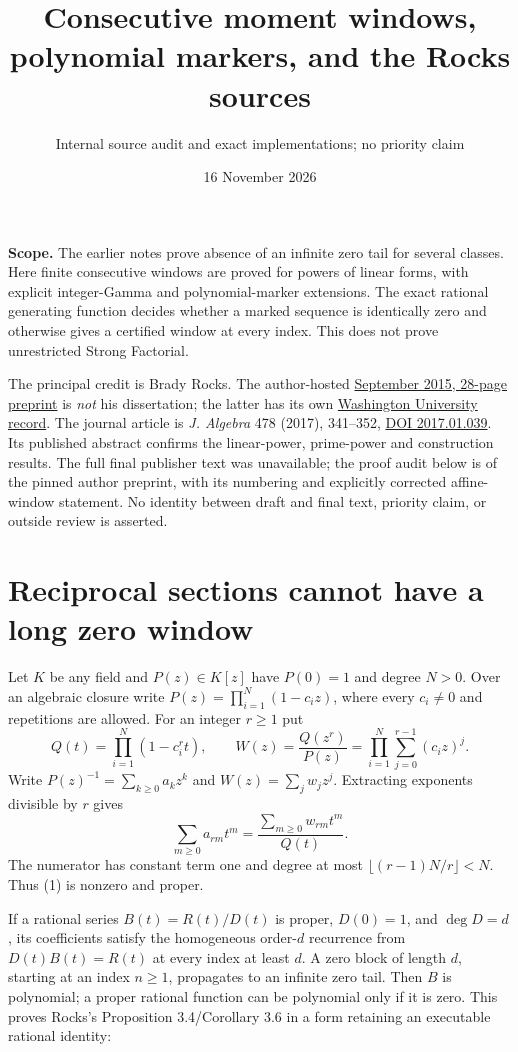 \documentclass[11pt]{article}
\title{Consecutive moment windows, polynomial markers, and the Rocks sources}
\author{Internal source audit and exact implementations; no priority claim}
\date{16 November 2026}
\begin{document}
\maketitle
\noindent\textbf{Scope.}
The earlier notes prove absence of an infinite zero tail for several
classes. Here finite consecutive windows are proved for powers of linear
forms, with explicit integer-Gamma and polynomial-marker extensions.
The exact rational generating function decides whether a marked sequence
is identically zero and otherwise gives a certified window at every index.
This does not prove unrestricted Strong Factorial.

The principal credit is Brady Rocks. The author-hosted
\href{sources/rocks-2015-author-preprint.pdf}{September 2015, 28-page preprint}
is \emph{not} his dissertation; the latter has its own
\href{https://doi.org/10.7936/K7BR8QB4}{Washington University record}.
The journal article is \emph{J. Algebra} 478 (2017), 341--352,
\href{https://doi.org/10.1016/j.jalgebra.2017.01.039}{DOI 2017.01.039}.
Its published abstract confirms the linear-power, prime-power and
construction results. The full final publisher text was unavailable;
the proof audit below is of the pinned author preprint, with its numbering
and explicitly corrected affine-window statement. No identity between
draft and final text, priority claim, or outside review is asserted.

\section{Reciprocal sections cannot have a long zero window}
Let $K$ be any field and $P(z)\in K[z]$ have $P(0)=1$ and degree $N>0$.
Over an algebraic closure write $P(z)=\prod_{i=1}^N(1-c_i z)$,
where every $c_i\ne0$ and repetitions are allowed. For an integer $r\ge1$ put
\[
 Q(t)=\prod_{i=1}^N(1-c_i^r t),\qquad
 W(z)=\frac{Q(z^r)}{P(z)}
     =\prod_{i=1}^N\sum_{j=0}^{r-1}(c_i z)^j.
\]
Write $P(z)^{-1}=\sum_{k\ge0}a_kz^k$ and $W(z)=\sum_jw_jz^j$.
Extracting exponents divisible by $r$ gives
\[
 \sum_{m\ge0}a_{rm}t^m=
 \frac{\sum_{m\ge0}w_{rm}t^m}{Q(t)}.                 \tag{1}
\]
The numerator has constant term one and degree at most
$\lfloor(r-1)N/r\rfloor<N$. Thus (1) is nonzero and proper.

If a rational series $B(t)=R(t)/D(t)$ is proper, $D(0)=1$, and
$\deg D=d$, its coefficients satisfy the homogeneous order-$d$ recurrence
from $D(t)B(t)=R(t)$ at every index at least $d$. A zero block of length
$d$, starting at an index $n\ge1$, propagates to an infinite zero tail.
Then $B$ is polynomial; a proper rational function can be polynomial only
if it is zero. This proves Rocks's Proposition 3.4/Corollary 3.6 in a
form retaining an executable rational identity:
\end{document}
